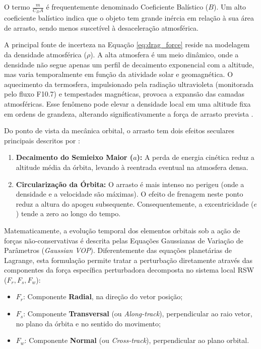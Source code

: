 O termo $\frac{m}{C_D A}$ é frequentemente denominado Coeficiente Balístico ($B$). Um alto coeficiente balístico indica que o objeto tem grande inércia em relação à sua área de arrasto, sendo menos suscetível à desaceleração atmosférica.

A principal fonte de incerteza na Equação \ref{eq:drag_force} reside na modelagem da densidade atmosférica ($\rho$). A alta atmosfera é um meio dinâmico, onde a densidade não segue apenas um perfil de decaimento exponencial com a altitude, mas varia temporalmente em função da atividade solar e geomagnética. O aquecimento da termosfera, impulsionado pela radiação ultravioleta (monitorada pelo fluxo F10.7) e tempestades magnéticas, provoca a expansão das camadas atmosféricas. Esse fenômeno pode elevar a densidade local em uma altitude fixa em ordens de grandeza, alterando significativamente a força de arrasto prevista \cite{Jacchia1977}.

Do ponto de vista da mecânica orbital, o arrasto tem dois efeitos seculares principais descritos por :
\begin{enumerate}
    \item \textbf{Decaimento do Semieixo Maior ($a$):} A perda de energia cinética reduz a altitude média da órbita, levando à reentrada eventual na atmosfera densa.
    \item \textbf{Circularização da Órbita:} O arrasto é mais intenso no perigeu (onde a densidade e a velocidade são máximas). O efeito de frenagem neste ponto reduz a altura do apogeu subsequente. Consequentemente, a excentricidade ($e$) tende a zero ao longo do tempo.
\end{enumerate}

Matematicamente, a evolução temporal dos elementos orbitais sob a ação de forças não-conservativas é descrita pelas Equações Gaussianas de Variação de Parâmetros (\textit{Gaussian VOP}). Diferentemente das equações planetárias de Lagrange, esta formulação permite tratar a perturbação diretamente através das componentes da força específica perturbadora decomposta no sistema local RSW ($F_r, F_s, F_w$):

\begin{itemize}
    \item $F_r$: Componente \textbf{Radial}, na direção do vetor posição;
    \item $F_s$: Componente \textbf{Transversal} (ou \textit{Along-track}), perpendicular ao raio vetor, no plano da órbita e no sentido do movimento;
    \item $F_w$: Componente \textbf{Normal} (ou \textit{Cross-track}), perpendicular ao plano orbital.
\end{itemize}

